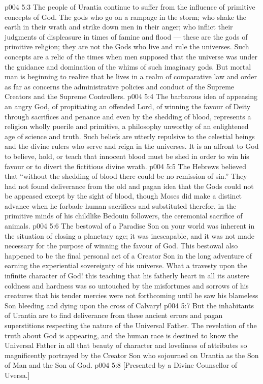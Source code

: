 \vs p004 5:3 \pc The people of Urantia continue to suffer from the influence of primitive concepts of God. The gods who go on a rampage in the storm; who shake the earth in their wrath and strike down men in their anger; who inflict their judgments of displeasure in times of famine and flood --- these are the gods of primitive religion; they are not the Gods who live and rule the universes. Such concepts are a relic of the times when men supposed that the universe was under the guidance and domination of the whims of such imaginary gods. But mortal man is beginning to realize that he lives in a realm of comparative law and order as far as concerns the administrative policies and conduct of the Supreme Creators and the Supreme Controllers.
\vs p004 5:4 \pc The barbarous idea of appeasing an angry God, of propitiating an offended Lord, of winning the favour of Deity through sacrifices and penance and even by the shedding of blood, represents a religion wholly puerile and primitive, a philosophy unworthy of an enlightened age of science and truth. Such beliefs are utterly repulsive to the celestial beings and the divine rulers who serve and reign in the universes. It is an affront to God to believe, hold, or teach that innocent blood must be shed in order to win his favour or to divert the fictitious divine wrath.
\vs p004 5:5 The Hebrews believed that “without the shedding of blood there could be no remission of sin.” They had not found deliverance from the old and pagan idea that the Gods could not be appeased except by the sight of blood, though Moses did make a distinct advance when he forbade human sacrifices and substituted therefor, in the primitive minds of his childlike Bedouin followers, the ceremonial sacrifice of animals.
\vs p004 5:6 The bestowal of a Paradise Son on your world was inherent in the situation of closing a planetary age; it was inescapable, and it was not made necessary for the purpose of winning the favour of God. This bestowal also happened to be the final personal act of a Creator Son in the long adventure of earning the experiential sovereignty of his universe. What a travesty upon the infinite character of God! this teaching that his fatherly heart in all its austere coldness and hardness was so untouched by the misfortunes and sorrows of his creatures that his tender mercies were not forthcoming until he saw his blameless Son bleeding and dying upon the cross of Calvary!
\vs p004 5:7 But the inhabitants of Urantia are to find deliverance from these ancient errors and pagan superstitions respecting the nature of the Universal Father. The revelation of the truth about God is appearing, and the human race is destined to know the Universal Father in all that beauty of character and loveliness of attributes so magnificently portrayed by the Creator Son who sojourned on Urantia as the Son of Man and the Son of God.
\vsetoff
\vs p004 5:8 [Presented by a Divine Counsellor of Uversa.]
\quizlink
